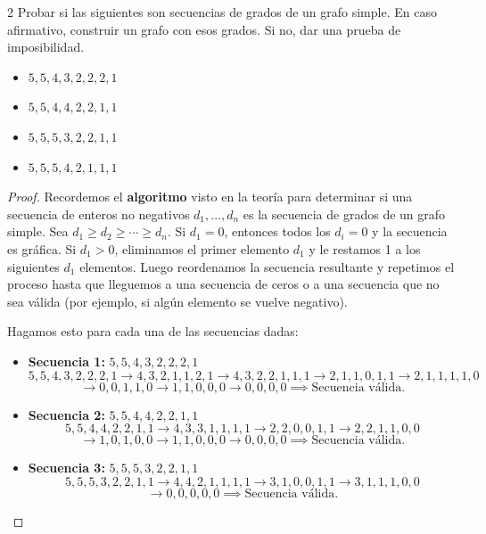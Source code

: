 \begin{ejercicioEntregar}{2}
	Probar si las siguientes son secuencias de grados de un grafo simple. En caso afirmativo, construir un grafo con esos grados. Si no, dar una prueba de imposibilidad.
	\begin{itemize}
		\item \( 5, 5, 4, 3, 2, 2, 2, 1 \)
		\item \( 5, 5, 4, 4, 2, 2, 1, 1 \)
		\item \( 5, 5, 5, 3, 2, 2, 1, 1 \)
		\item \( 5, 5, 5, 4, 2, 1, 1, 1 \)
	\end{itemize}
\end{ejercicioEntregar}
\begin{proof}
	Recordemos el \textbf{algoritmo} visto en la teoría para determinar si una secuencia de enteros no negativos \( d_1, \ldots, d_n \) es la secuencia de grados de un grafo simple. Sea \( d_1 \geq d_2 \geq \cdots \geq d_n \). Si \( d_1 = 0 \), entonces todos los \( d_i = 0 \) y la secuencia es gráfica. Si \( d_1 > 0 \), eliminamos el primer elemento \( d_1 \) y le restamos 1 a los siguientes \( d_1 \) elementos. Luego reordenamos la secuencia resultante y repetimos el proceso hasta que lleguemos a una secuencia de ceros o a una secuencia que no sea válida (por ejemplo, si algún elemento se vuelve negativo).

	Hagamos esto para cada una de las secuencias dadas:
	\begin{itemize}
		\item \textbf{Secuencia 1:} \( 5, 5, 4, 3, 2, 2, 2, 1 \)
		      \[
			      5, 5, 4, 3, 2, 2, 2, 1 \to 4, 3, 2, 1, 1, 2, 1 \to 4, 3, 2, 2, 1, 1, 1 \to 2, 1, 1, 0, 1, 1 \to 2, 1, 1, 1, 1, 0
		      \]
		      \[
			      \to 0, 0, 1, 1, 0 \to 1, 1, 0, 0, 0 \to 0, 0, 0, 0 \implies \text{Secuencia válida.}
		      \]

		\item \textbf{Secuencia 2:} \( 5, 5, 4, 4, 2, 2, 1, 1 \)
		      \[
			      5, 5, 4, 4, 2, 2, 1, 1 \to 4, 3, 3, 1, 1, 1, 1 \to 2, 2, 0, 0, 1, 1 \to 2, 2, 1, 1, 0, 0
		      \]
		      \[
			      \to 1, 0, 1, 0, 0 \to 1, 1, 0, 0, 0 \to 0, 0, 0, 0 \implies \text{Secuencia válida.}
		      \]

		\item \textbf{Secuencia 3:} \( 5, 5, 5, 3, 2, 2, 1, 1 \)
		      \[
			      5, 5, 5, 3, 2, 2, 1, 1 \to 4, 4, 2, 1, 1, 1, 1 \to 3, 1, 0, 0, 1, 1 \to 3, 1, 1, 1, 0, 0
		      \]
		      \[
			      \to 0, 0, 0, 0, 0 \implies \text{Secuencia válida.}
		      \]


\end{itemize}
\end{proof}
